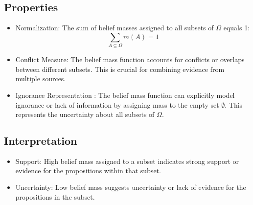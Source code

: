 \subsection{Properties}

\begin{itemize}
    \item Normalization: The sum of belief masses assigned to all subsets of $ \Omega $ equals 1:
          $$ \sum_{A \subseteq \Omega} m(A) = 1 $$
    \item Conflict Measure: The belief mass function accounts for conflicts or overlaps between different subsets. This is crucial for combining evidence from multiple sources.
    \item Ignorance Representation : The belief mass function can explicitly model ignorance or lack of information by assigning mass to the empty set $\emptyset$.
          This represents the uncertainty about all subsets of $ \Omega $.
\end{itemize}

\subsection{Interpretation}

\begin{itemize}
    \item Support: High belief mass assigned to a subset indicates strong support or evidence for the propositions within that subset.
    \item Uncertainty: Low belief mass suggests uncertainty or lack of evidence for the propositions in the subset.
\end{itemize}

